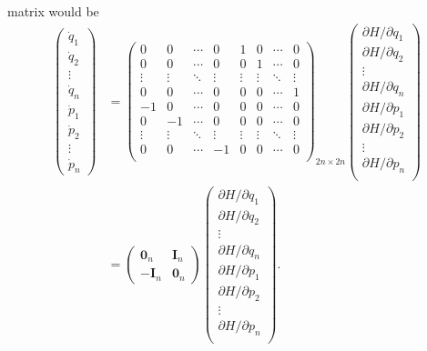 matrix would be \begin{align*}
    \begin{pmatrix}
        \dot{q}_1 \\
        \dot{q}_2 \\
        \vdots \\
        \dot{q}_n \\
        \dot{p}_1 \\
        \dot{p}_2 \\
        \vdots \\
        \dot{p}_n
    \end{pmatrix} & = \begin{pmatrix}
        0 & 0 & \cdots & 0 & 1 & 0 & \cdots & 0 \\
        0 & 0 & \cdots & 0 & 0 & 1 & \cdots & 0 \\
        \vdots & \vdots & \ddots & \vdots & \vdots & \vdots & \ddots & \vdots \\
        0 & 0 & \cdots & 0 & 0 & 0 & \cdots & 1 \\
        -1 & 0 & \cdots & 0 & 0 & 0 & \cdots & 0 \\
        0 & -1 & \cdots & 0 & 0 & 0 & \cdots & 0 \\
        \vdots & \vdots & \ddots & \vdots & \vdots & \vdots & \ddots & \vdots \\
        0 & 0 & \cdots & -1 & 0 & 0 & \cdots & 0 \\
    \end{pmatrix}_{2n \times 2n} \begin{pmatrix}
        \partial H / \partial q_1 \\
        \partial H / \partial q_2 \\
        \vdots \\
        \partial H / \partial q_n \\
        \partial H / \partial p_1 \\
        \partial H / \partial p_2 \\
        \vdots \\
        \partial H / \partial p_n \\
    \end{pmatrix}  \\
    & = \begin{pmatrix}
        \mathbf{0}_n & \mathbf{I}_n \\
        - \mathbf{I}_n & \mathbf{0}_n
    \end{pmatrix} \begin{pmatrix}
        \partial H / \partial q_1 \\
        \partial H / \partial q_2 \\
        \vdots \\
        \partial H / \partial q_n \\
        \partial H / \partial p_1 \\
        \partial H / \partial p_2 \\
        \vdots \\
        \partial H / \partial p_n \\
    \end{pmatrix}.  \\
\end{align*}

